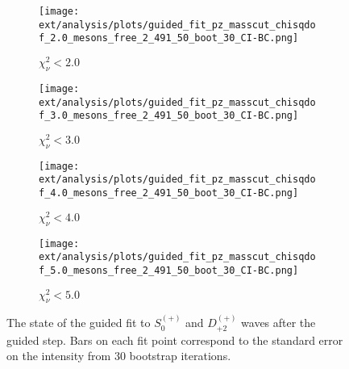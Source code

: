 \begin{figure}[htbp]
    \centering
    \begin{subfigure}{0.45\textwidth}
        \texttt{[image: ext/analysis/plots/guided\_fit\_pz\_masscut\_chisqdof\_2.0\_mesons\_free\_2\_491\_50\_boot\_30\_CI-BC.png]}
        \caption{$\chi^2_\nu < 2.0$}
    \end{subfigure}
    \hfill
    \begin{subfigure}{0.45\textwidth}
        \texttt{[image: ext/analysis/plots/guided\_fit\_pz\_masscut\_chisqdof\_3.0\_mesons\_free\_2\_491\_50\_boot\_30\_CI-BC.png]}
        \caption{$\chi^2_\nu < 3.0$}
    \end{subfigure}
    \vspace{1em}
    \begin{subfigure}{0.45\textwidth}
        \texttt{[image: ext/analysis/plots/guided\_fit\_pz\_masscut\_chisqdof\_4.0\_mesons\_free\_2\_491\_50\_boot\_30\_CI-BC.png]}
        \caption{$\chi^2_\nu < 4.0$}
    \end{subfigure}
    \hfill
    \begin{subfigure}{0.45\textwidth}
        \texttt{[image: ext/analysis/plots/guided\_fit\_pz\_masscut\_chisqdof\_5.0\_mesons\_free\_2\_491\_50\_boot\_30\_CI-BC.png]}
        \caption{$\chi^2_\nu < 5.0$}
    \end{subfigure}

    \caption{The state of the guided fit to $S_{0}^{(+)}$ and $D_{+2}^{(+)}$ waves after the guided step. Bars on each fit point correspond to the standard error on the intensity from $ 30 $ bootstrap iterations.}
    \label{fig:guided-fit-all-Sp-D2p}
\end{figure}

